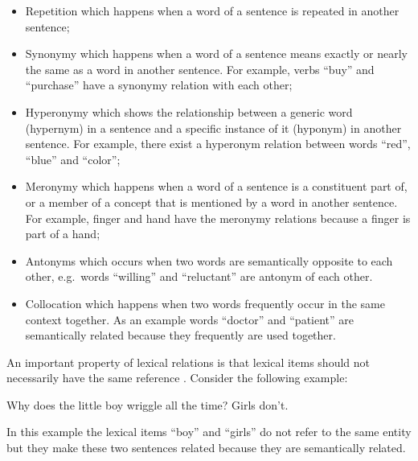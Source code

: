 \begin{itemize}

\item Repetition which happens when a word of a sentence is repeated in another sentence; 


\item Synonymy which happens when a word of a sentence means exactly or nearly the same as a word in another sentence. 
For example, verbs ``buy'' and ``purchase'' have a synonymy relation with each other;  

\item Hyperonymy which shows the relationship between a generic word (hypernym) in a sentence and a specific instance of it (hyponym) in another sentence. 
For example, there exist a hyperonym relation between words ``red'', ``blue'' and ``color'';

\item Meronymy which happens when a word of a sentence is a constituent part of, or a member of a concept that is mentioned by a word in another sentence. 
For example, finger and hand have the meronymy relations because a finger is part of a hand;

\item Antonyms which occurs when two words are semantically opposite to each other, e.g.\ words ``willing'' and  ``reluctant'' are antonym of each other. 

\item Collocation which happens when two words frequently occur in the same context together. As an example words ``doctor'' and ``patient'' are semantically related because they frequently are used together.

\end{itemize}

An important property of lexical relations is that lexical items should not necessarily have the same reference \cite{halliday76}. 
Consider the following example: 

\begin{examples}
Why does the little boy wriggle all the time? Girls don't.
\end{examples}

In this example the lexical items ``boy'' and ``girls'' do not refer to the same entity but they make these two sentences related because they are semantically related.  

